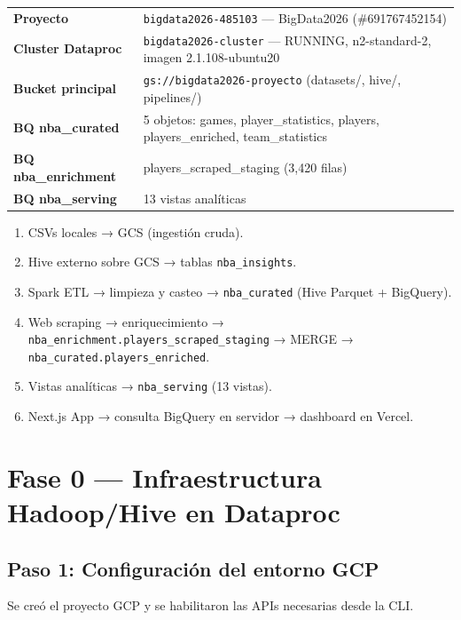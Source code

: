 \documentclass[12pt, letterpaper]{article}
\begin{document}
\begin{tcolorbox}[infostyle, title={Recursos GCP activos (evidencia \texttt{gcloud} + \texttt{bq ls})}]
\begin{tabular}{@{}ll@{}}
  \textbf{Proyecto}         & \texttt{bigdata2026-485103} — BigData2026 (\#691767452154) \\
  \textbf{Cluster Dataproc} & \texttt{bigdata2026-cluster} — RUNNING, n2-standard-2, imagen 2.1.108-ubuntu20 \\
  \textbf{Bucket principal} & \texttt{gs://bigdata2026-proyecto} (datasets/, hive/, pipelines/) \\
  \textbf{BQ nba\_curated}  & 5 objetos: games, player\_statistics, players, players\_enriched, team\_statistics \\
  \textbf{BQ nba\_enrichment} & players\_scraped\_staging (3,420 filas) \\
  \textbf{BQ nba\_serving}  & 13 vistas analíticas \\
\end{tabular}
\end{tcolorbox}

\begin{enumerate}
  \item CSVs locales → GCS (ingestión cruda).
  \item Hive externo sobre GCS → tablas \texttt{nba\_insights}.
  \item Spark ETL → limpieza y casteo → \texttt{nba\_curated} (Hive Parquet + BigQuery).
  \item Web scraping → enriquecimiento → \texttt{nba\_enrichment.players\_scraped\_staging} → MERGE → \texttt{nba\_curated.players\_enriched}.
  \item Vistas analíticas → \texttt{nba\_serving} (13 vistas).
  \item Next.js App → consulta BigQuery en servidor → dashboard en Vercel.
\end{enumerate}

\section{Fase 0 — Infraestructura Hadoop/Hive en Dataproc}

\subsection{Paso 1: Configuración del entorno GCP}

Se creó el proyecto GCP y se habilitaron las APIs necesarias desde la CLI.
\end{document}
